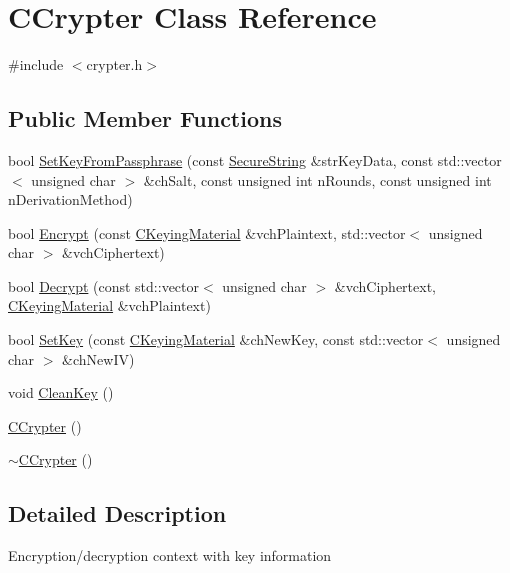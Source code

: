 \hypertarget{class_c_crypter}{}\section{C\+Crypter Class Reference}
\label{class_c_crypter}


{\ttfamily \#include $<$crypter.\+h$>$}

\subsection*{Public Member Functions}
\begin{DoxyCompactItemize}
\item 
bool \hyperlink{class_c_crypter_a5368279e4a1549d3c1d15d8aa2179708}{Set\+Key\+From\+Passphrase} (const \hyperlink{allocators_8h_a396ed773a5ac24aec28c8f7dc413c7ac}{Secure\+String} \&str\+Key\+Data, const std\+::vector$<$ unsigned char $>$ \&ch\+Salt, const unsigned int n\+Rounds, const unsigned int n\+Derivation\+Method)
\item 
bool \hyperlink{class_c_crypter_a124fcd3021569a660ce2daa3391c8ea4}{Encrypt} (const \hyperlink{crypter_8h_a64709c9a3acc8f5694515789a183ad7b}{C\+Keying\+Material} \&vch\+Plaintext, std\+::vector$<$ unsigned char $>$ \&vch\+Ciphertext)
\item 
bool \hyperlink{class_c_crypter_a4dbabed4975d4435d22c76deac43df7f}{Decrypt} (const std\+::vector$<$ unsigned char $>$ \&vch\+Ciphertext, \hyperlink{crypter_8h_a64709c9a3acc8f5694515789a183ad7b}{C\+Keying\+Material} \&vch\+Plaintext)
\item 
bool \hyperlink{class_c_crypter_a0d948dd4796e2420e1dd9c1ddbf7974e}{Set\+Key} (const \hyperlink{crypter_8h_a64709c9a3acc8f5694515789a183ad7b}{C\+Keying\+Material} \&ch\+New\+Key, const std\+::vector$<$ unsigned char $>$ \&ch\+New\+I\+V)
\item 
void \hyperlink{class_c_crypter_a6910b4cff4ee40e33fbb3789dc12c139}{Clean\+Key} ()
\item 
\hyperlink{class_c_crypter_a4bbf5c23b0350f04e0c8e3b4ef28615e}{C\+Crypter} ()
\item 
\hyperlink{class_c_crypter_ac0dccc762fb60fe9605409232ebfaa0f}{$\sim$\+C\+Crypter} ()
\end{DoxyCompactItemize}


\subsection{Detailed Description}
Encryption/decryption context with key information 


